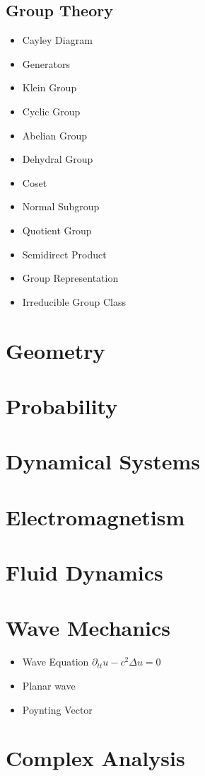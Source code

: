 \documentclass[10pt]{article}
\begin{document}
\subsection{Group Theory}
\begin{itemize}
	\item Cayley Diagram
	\item Generators
	\item Klein Group
	\item Cyclic Group
	\item Abelian Group
	\item Dehydral Group
	\item Coset
	\item Normal Subgroup
	\item Quotient Group
	\item Semidirect Product
	\item Group Representation 
	\item Irreducible Group Class
\end{itemize}
\section{Geometry}
\section{Probability}
\section{Dynamical Systems}
\section{Electromagnetism}
\section{Fluid Dynamics}
\section{Wave Mechanics}
	\begin{itemize}
	\item Wave Equation $\partial_{tt} u-c^2\Delta u=0$
	\item Planar wave
	\item Poynting Vector
	\end{itemize}
\section{Complex Analysis}
\end{document}
